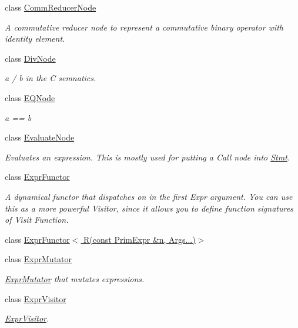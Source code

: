 \begin{DoxyCompactItemize}
\item 
class \hyperlink{classtvm_1_1tir_1_1CommReducerNode}{Comm\+Reducer\+Node}
\begin{DoxyCompactList}\small\item\em A commutative reducer node to represent a commutative binary operator with identity element. \end{DoxyCompactList}\item 
class \hyperlink{classtvm_1_1tir_1_1DivNode}{Div\+Node}
\begin{DoxyCompactList}\small\item\em a / b in the C semnatics. \end{DoxyCompactList}\item 
class \hyperlink{classtvm_1_1tir_1_1EQNode}{E\+Q\+Node}
\begin{DoxyCompactList}\small\item\em a == b \end{DoxyCompactList}\item 
class \hyperlink{classtvm_1_1tir_1_1EvaluateNode}{Evaluate\+Node}
\begin{DoxyCompactList}\small\item\em Evaluates an expression. This is mostly used for putting a Call node into \hyperlink{classtvm_1_1tir_1_1Stmt}{Stmt}. \end{DoxyCompactList}\item 
class \hyperlink{classtvm_1_1tir_1_1ExprFunctor}{Expr\+Functor}
\begin{DoxyCompactList}\small\item\em A dynamical functor that dispatches on in the first Expr argument. You can use this as a more powerful Visitor, since it allows you to define function signatures of Visit Function. \end{DoxyCompactList}\item 
class \hyperlink{classtvm_1_1tir_1_1ExprFunctor_3_01R_07const_01PrimExpr_01_6n_00_01Args_8_8_8_08_4}{Expr\+Functor$<$ R(const Prim\+Expr \&n, Args...)$>$}
\item 
class \hyperlink{classtvm_1_1tir_1_1ExprMutator}{Expr\+Mutator}
\begin{DoxyCompactList}\small\item\em \hyperlink{classtvm_1_1tir_1_1ExprMutator}{Expr\+Mutator} that mutates expressions. \end{DoxyCompactList}\item 
class \hyperlink{classtvm_1_1tir_1_1ExprVisitor}{Expr\+Visitor}
\begin{DoxyCompactList}\small\item\em \hyperlink{classtvm_1_1tir_1_1ExprVisitor}{Expr\+Visitor}. \end{DoxyCompactList}\item 

\end{DoxyCompactItemize}
